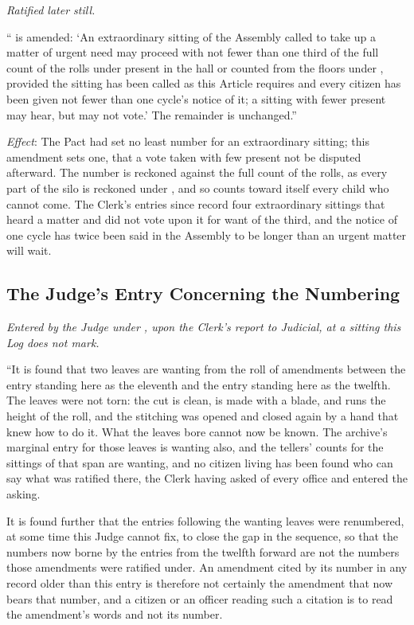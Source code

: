 \textit{Ratified later still.}

`` is amended: `An extraordinary sitting of the Assembly called to take up a matter of urgent need may proceed with not fewer than one third of the full count of the rolls under  present in the hall or counted from the floors under , provided the sitting has been called as this Article requires and every citizen has been given not fewer than one cycle's notice of it; a sitting with fewer present may hear, but may not vote.' The remainder is unchanged.''

\textit{Effect}: The Pact had set no least number for an extraordinary sitting; this amendment sets one, that a vote taken with few present not be disputed afterward. The number is reckoned against the full count of the rolls, as every part of the silo is reckoned under , and so counts toward itself every child who cannot come. The Clerk's entries since record four extraordinary sittings that heard a matter and did not vote upon it for want of the third, and the notice of one cycle has twice been said in the Assembly to be longer than an urgent matter will wait.

\subsection*{The Judge's Entry Concerning the Numbering}

\textit{Entered by the Judge under , upon the Clerk's report to Judicial, at a sitting this Log does not mark.}

``It is found that two leaves are wanting from the roll of amendments between the entry standing here as the eleventh and the entry standing here as the twelfth. The leaves were not torn: the cut is clean, is made with a blade, and runs the height of the roll, and the stitching was opened and closed again by a hand that knew how to do it. What the leaves bore cannot now be known. The archive's marginal entry for those leaves is wanting also, and the tellers' counts for the sittings of that span are wanting, and no citizen living has been found who can say what was ratified there, the Clerk having asked of every office and entered the asking.

It is found further that the entries following the wanting leaves were renumbered, at some time this Judge cannot fix, to close the gap in the sequence, so that the numbers now borne by the entries from the twelfth forward are not the numbers those amendments were ratified under. An amendment cited by its number in any record older than this entry is therefore not certainly the amendment that now bears that number, and a citizen or an officer reading such a citation is to read the amendment's words and not its number.

